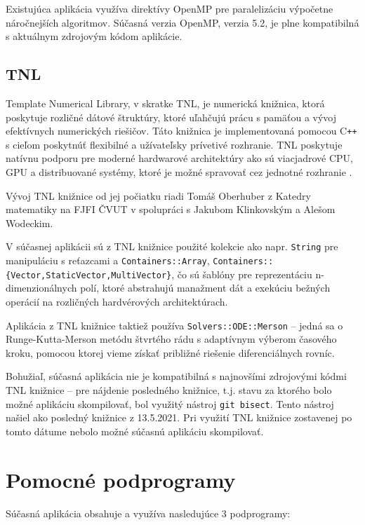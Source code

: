 Existujúca aplikácia využíva direktívy OpenMP pre paralelizáciu výpočetne náročnejších algoritmov. Súčasná verzia OpenMP, verzia 5.2, je plne kompatibilná s aktuálnym zdrojovým kódom aplikácie.

\subsection {TNL}\label{tnl}

Template Numerical Library, v skratke TNL, je numerická knižnica, ktorá poskytuje rozličné dátové štruktúry, ktoré uľahčujú prácu s pamäťou a vývoj efektívnych numerických riešičov. Táto knižnica je implementovaná pomocou C\texttt{++} s cieľom poskytnúť flexibilné a užívateľsky prívetivé rozhranie. TNL poskytuje natívnu podporu pre moderné hardwarové architektúry ako sú viacjadrové CPU, GPU a distribuované systémy, ktoré je možné spravovať cez jednotné rozhranie \cite{tnl_description}.

Vývoj TNL knižnice od jej počiatku riadi Tomáš Oberhuber z Katedry matematiky na FJFI ČVUT v spolupráci s Jakubom Klinkovským a Alešom Wodeckim.

V súčasnej aplikácii sú z TNL knižnice použité kolekcie ako napr. \texttt{String} pre manipuláciu s reťazcami a \texttt{Containers::Array}, \texttt{Containers::\{Vector,StaticVector,MultiVector\}}, čo sú šablóny pre reprezentáciu n-dimenzionálnych polí, ktoré abstrahujú manažment dát a exekúciu bežných operácií na rozličných hardvérových architektúrach.

Aplikácia z TNL knižnice taktiež používa \texttt{Solvers::ODE::Merson} -- jedná sa o Runge-Kutta-Merson metódu štvrtého rádu s adaptívnym výberom časového kroku, pomocou ktorej vieme získať približné riešenie diferenciálnych rovníc.

Bohužiaľ, súčasná aplikácia nie je kompatibilná s najnovšími zdrojovými kódmi TNL knižnice -- pre nájdenie posledného  knižnice, t.j. stavu za ktorého bolo možné aplikáciu skompilovať, bol využitý nástroj \texttt{git bisect}. Tento nástroj našiel ako posledný  knižnice z 13.5.2021. Pri využití TNL knižnice zostavenej po tomto dátume nebolo možné súčasnú aplikáciu skompilovať.

\section {Pomocné podprogramy}\label{helper_apps}

Súčasná aplikácia obsahuje a využíva nasledujúce 3 podprogramy:

